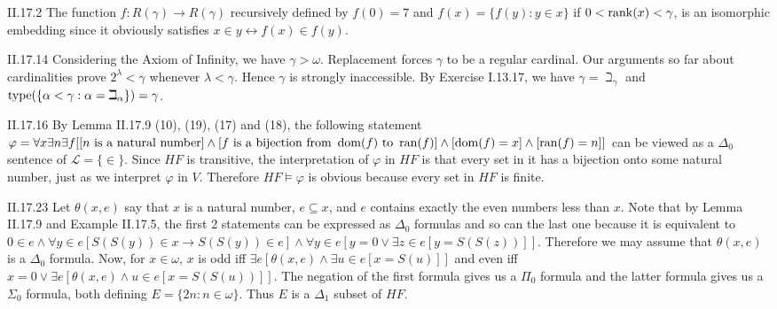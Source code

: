 \documentclass[12pt]{article}
\begin{document}
\begin{customthm}{II.17.2}
  The function $f:R(\gamma)\rightarrow R(\gamma)$ recursively defined by $f(0)=7$ and $f(x)=\{f(y):y\in x\}$ if $0<\mathop{\mathrm{rank}}(x)<\gamma$, is an isomorphic embedding since it obviously satisfies $x\in y\leftrightarrow f(x)\in f(y)$.
\end{customthm}

\begin{customthm}{II.17.14}
  Considering the Axiom of Infinity, we have $\gamma>\omega$. Replacement forces $\gamma$ to be a regular cardinal. Our arguments so far about cardinalities prove $2^\lambda<\gamma$ whenever $\lambda<\gamma$. Hence $\gamma$ is strongly inaccessible. By Exercise I.13.17, we have $\gamma=\beth_\gamma$ and $\mathop{\mathrm{type}}(\{\alpha<\gamma:\alpha=\beth_\alpha\})=\gamma$.
\end{customthm}

\begin{customthm}{II.17.16}
  By Lemma II.17.9 (10), (19), (17) and (18), the following statement $\varphi=\forall x\exists n\exists f[[n\textrm{ is a natural number}]\wedge[f\textrm{ is a bijection from }\mathop{\mathrm{dom}}(f)\textrm{ to }\mathop{\mathrm{ran}}(f)]\wedge[\mathop{\mathrm{dom}}(f)=x]\wedge[\mathop{\mathrm{ran}}(f)=n]]$ can be viewed as a $\Delta_0$ sentence of $\mathcal{L}=\{\in\}$. Since $HF$ is transitive, the interpretation of $\varphi$ in $HF$ is that every set in it has a bijection onto some natural number, just as we interpret $\varphi$ in $V$. Therefore $HF\models\varphi$ is obvious because every set in $HF$ is finite.
\end{customthm}

\begin{customthm}{II.17.23}
  Let $\theta(x,e)$ say that $x$ is a natural number, $e\subseteq x$, and $e$ contains exactly the even numbers less than $x$. Note that by Lemma II.17.9 and Example II.17.5, the first 2 statements can be expressed as $\Delta_0$ formulas and so can the last one because it is equivalent to $0\in e\wedge\forall y\in e[S(S(y))\in x\rightarrow S(S(y))\in e]\wedge\forall y\in e[y=0\vee\exists z\in e[y=S(S(z))]]$. Therefore we may assume that $\theta(x,e)$ is a $\Delta_0$ formula. Now, for $x\in\omega$, $x$ is odd iff $\exists e[\theta(x,e)\wedge\exists u\in e[x=S(u)]]$ and even iff $x=0\vee\exists e[\theta(x,e)\wedge u\in e[x=S(S(u))]]$. The negation of the first formula gives us a $\Pi_0$ formula and the latter formula gives us a $\Sigma_0$ formula, both defining $E=\{2n:n\in\omega\}$. Thus $E$ is a $\Delta_1$ subset of $HF$.
\end{customthm}
\end{document}
